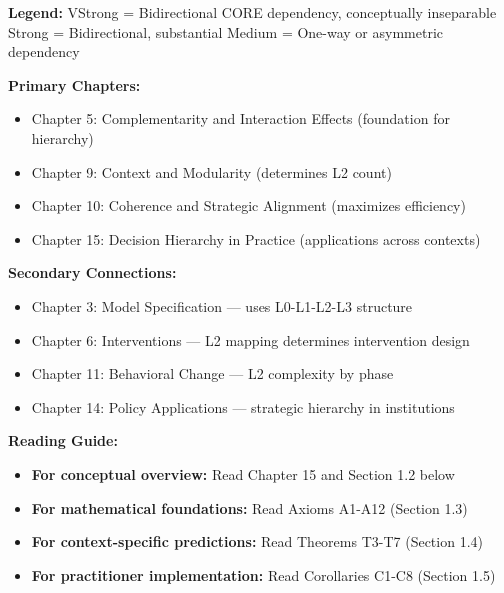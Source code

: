 \begin{tcolorbox}[colback=white, colframe=black,
    title=\textbf{9C Integration: How HI CORE-HIERARCHY Connects to Other COREs}]
\begin{description}[style=nextline, labelindent=0pt, leftmargin=1.5cm]
\end{description}

\textbf{Legend:}
\colorbox{red!20}{VStrong} = Bidirectional CORE dependency, conceptually inseparable \quad
\colorbox{red!20}{Strong} = Bidirectional, substantial \quad
\colorbox{yellow!20}{Medium} = One-way or asymmetric dependency

\end{tcolorbox}


\begin{tcolorbox}[colback=purple!5!white, colframe=purple!75!black,
    title=\textbf{Chapter Linkages}]

\textbf{Primary Chapters:}
\begin{itemize}[nosep]
    \item Chapter 5: Complementarity and Interaction Effects (foundation for hierarchy)
    \item Chapter 9: Context and Modularity (determines L2 count)
    \item Chapter 10: Coherence and Strategic Alignment (maximizes efficiency)
    \item Chapter 15: Decision Hierarchy in Practice (applications across contexts)
\end{itemize}

\textbf{Secondary Connections:}
\begin{itemize}[nosep]
    \item Chapter 3: Model Specification --- uses L0-L1-L2-L3 structure
    \item Chapter 6: Interventions --- L2 mapping determines intervention design
    \item Chapter 11: Behavioral Change --- L2 complexity by phase
    \item Chapter 14: Policy Applications --- strategic hierarchy in institutions
\end{itemize}

\textbf{Reading Guide:}
\begin{itemize}[nosep]
    \item \textbf{For conceptual overview:} Read Chapter 15 and Section 1.2 below
    \item \textbf{For mathematical foundations:} Read Axioms A1-A12 (Section 1.3)
    \item \textbf{For context-specific predictions:} Read Theorems T3-T7 (Section 1.4)
    \item \textbf{For practitioner implementation:} Read Corollaries C1-C8 (Section 1.5)
\end{itemize}

\end{tcolorbox}

